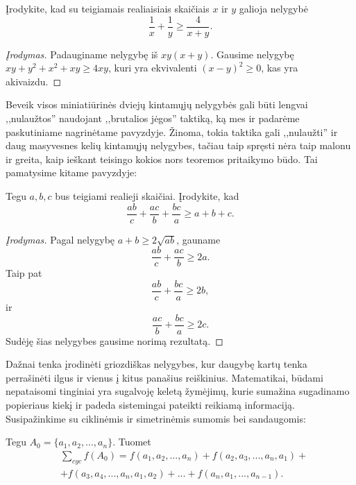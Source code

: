 \begin{pavnr}
  Įrodykite, kad su teigiamais realiaisiais skaičiais $x$ ir $y$ galioja
  nelygybė $$\frac{1}{x}+\frac{1}{y}\geq \frac{4}{x+y}.$$
\end{pavnr}

\begin{proof}[Įrodymas]
  Padauginame nelygybę iš $xy(x+y)$. Gausime nelygybę $xy+y^2+x^2+xy\geq
  4xy$, kuri yra ekvivalenti $(x-y)^2\geq0$, kas yra akivaizdu.
\end{proof}

\begin{pastaba}
  Beveik visos miniatiūrinės dviejų kintamųjų nelygybės gali būti lengvai
  ,,nulaužtos'' naudojant ,,brutalios jėgos'' taktiką, ką mes ir padarėme
  paskutiniame nagrinėtame pavyzdyje. Žinoma, tokia taktika gali ,,nulaužti'' ir
  daug masyvesnes kelių kintamųjų nelygybes, tačiau taip spręsti nėra taip
  malonu ir greita, kaip ieškant teisingo kokios nors teoremos pritaikymo būdo.
  Tai pamatysime kitame pavyzdyje:
\end{pastaba}

\begin{pavnr}
  Tegu $a,b,c$ bus teigiami realieji skaičiai. Įrodykite, kad
  $$\frac{ab}{c}+\frac{ac}{b}+\frac{bc}{a}\geq a+b+c.$$
\end{pavnr}

\begin{proof}[Įrodymas]
  Pagal nelygybę $a+b \geq 2\sqrt{ab}$, gauname
  $$\frac{ab}{c}+\frac{ac}{b}\geq 2a.$$ Taip pat
  $$\frac{ab}{c}+\frac{bc}{a}\geq 2b,$$ ir $$\frac{ac}{b}+\frac{bc}{a}\geq
  2c.$$ Sudėję šias nelygybes gausime norimą rezultatą.
\end{proof}

Dažnai tenka įrodinėti griozdiškas nelygybes, kur daugybę kartų tenka
perrašinėti ilgus ir vienus į kitus panašius reiškinius. Matematikai,
būdami nepataisomi tinginiai yra sugalvoję keletą žymėjimų, kurie
sumažina sugadinamo popieriaus kiekį ir padeda sistemingai pateikti
reikiamą informaciją. Susipažinkime su ciklinėmis ir simetrinėmis sumomis
bei sandaugomis:

\begin{api} Tegu $A_0=\{a_{1},a_{2},...,a_{n}\}.$ Tuomet
  \begin{align*}
    &\sum_{cyc}{f(A_0)}=f(a_{1},a_{2},...,a_{n})+f(a_{2},a_{3},...,a_{n},a_{1})+\\
    &+f(a_{3},a_{4},...,a_{n},a_{1},a_{2})+...+f(a_{n},a_{1},...,a_{n-1}).
  \end{align*}
\end{api}

